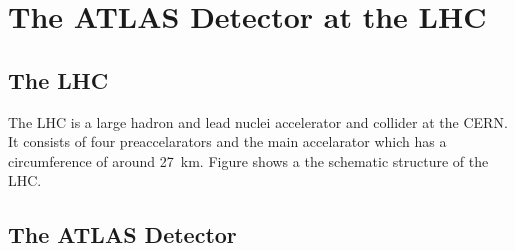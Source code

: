 \chapter{The ATLAS Detector at the LHC}

\section{The LHC}
The LHC \cite{LHC} is a large hadron and lead nuclei accelerator and collider at the CERN.
It consists of four preaccelarators and the main accelarator which has a circumference of around \SI{27}{km}. 
Figure \cite{LHC} shows a the schematic structure of the LHC.





\section{The ATLAS Detector}
